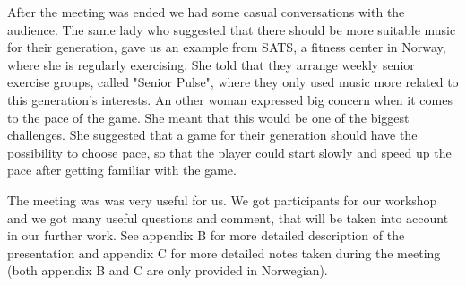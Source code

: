 After the meeting was ended we had some casual conversations with the audience. The same lady who suggested that there should be more suitable music for their generation, gave us an example from SATS, a fitness center in Norway, where she is regularly exercising. She told that they arrange weekly senior exercise groups, called "Senior Pulse", where they only used music more related to this generation's interests. An other woman expressed big concern when it comes to the pace of the game. She meant that this would be one of the biggest challenges. She suggested that a game for their generation should have the possibility to choose pace, so that the player could start slowly and speed up the pace after getting familiar with the game.

The meeting was was very useful for us. We got participants for our workshop and we got many useful questions and comment, that will be taken into account in our further work. See appendix B for more detailed description of the presentation and appendix C for more detailed notes taken during the meeting (both appendix B and C are only provided in Norwegian).

